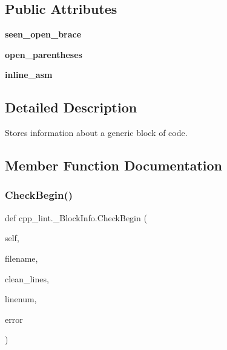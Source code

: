 \subsection*{Public Attributes}
\begin{DoxyCompactItemize}
\item 
\mbox{\label{classcpp__lint_1_1___block_info_a7629061e1d7dbc7d15cdd521239a29ad}} 
{\bfseries seen\+\_\+open\+\_\+brace}
\item 
\mbox{\label{classcpp__lint_1_1___block_info_a5b86c27ea6a6641fcb0d242dfed898b6}} 
{\bfseries open\+\_\+parentheses}
\item 
\mbox{\label{classcpp__lint_1_1___block_info_a7577f54a4359d9979e8765934b988187}} 
{\bfseries inline\+\_\+asm}
\end{DoxyCompactItemize}


\subsection{Detailed Description}
\begin{DoxyVerb}Stores information about a generic block of code.\end{DoxyVerb}
 

\subsection{Member Function Documentation}
\mbox{\label{classcpp__lint_1_1___block_info_a69357fb2efabae1dd77aab9942b90560}} 
\subsubsection{\texorpdfstring{Check\+Begin()}{CheckBegin()}}
{\footnotesize\ttfamily def cpp\+\_\+lint.\+\_\+\+Block\+Info.\+Check\+Begin (\begin{DoxyParamCaption}\item[{}]{self,  }\item[{}]{filename,  }\item[{}]{clean\+\_\+lines,  }\item[{}]{linenum,  }\item[{}]{error }\end{DoxyParamCaption})}

